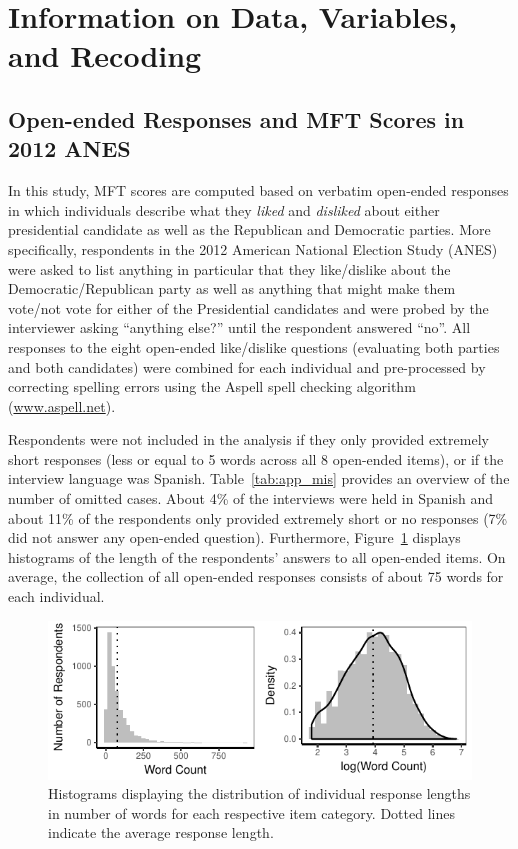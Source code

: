 \documentclass[12pt]{article}
\begin{document}
\clearpage

\renewcommand\thefigure{\thesection.\arabic{figure}}
\renewcommand\thetable{\thesection.\arabic{table}}
\setcounter{figure}{0}
\setcounter{table}{0}

\section{Information on Data, Variables, and Recoding}

\subsection{Open-ended Responses and MFT Scores in 2012 ANES}

In this study, MFT scores are computed based on verbatim open-ended responses in which individuals describe what they \textit{liked} and \textit{disliked} about either presidential candidate as well as the Republican and Democratic parties. More specifically, respondents in the 2012 American National Election Study (ANES) were asked to list anything in particular that they like/dislike about the Democratic/Republican party as well as anything that might make them vote/not vote for either of the Presidential candidates and were probed by the interviewer asking ``anything else?'' until the respondent answered ``no''. All responses to the eight open-ended like/dislike questions (evaluating both parties and both candidates) were combined for each individual and pre-processed by correcting spelling errors using the Aspell spell checking algorithm (\url{www.aspell.net}).



Respondents were not included in the analysis if they only provided extremely short responses (less or equal to 5 words across all 8 open-ended items), or if the interview language was Spanish. Table~\ref{tab:app_mis} provides an overview of the number of omitted cases. About 4\% of the interviews were held in Spanish and about 11\% of the respondents only provided extremely short or no responses (7\% did not answer any open-ended question). Furthermore, Figure~\ref{fig:appB2num} displays histograms of the length of the respondents' answers to all open-ended items. On average, the collection of all open-ended responses consists of about 75 words for each individual.

\begin{figure}[h]\centering
\includegraphics{../calc/fig/app_wc.pdf}
\caption{Histograms displaying the distribution of individual response lengths in number of words for each respective item category. Dotted lines indicate the average response length.}\label{fig:appB2num}
\end{figure}
\end{document}
